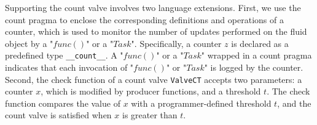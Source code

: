 

Supporting the count valve involves two language extensions. First, we use the count pragma to enclose the corresponding definitions and operations of a counter, which is used to monitor the number of updates performed on the fluid object by a "$func()$" or a "$Task$". Specifically, a counter $z$ is declared as a predefined type {\tt \_\_count\_\_}. A "$func()$" or a "$Task$" wrapped in a count pragma indicates that each invocation of "$func()$" or "$Task$" is logged by the counter. Second, the check function of a count valve {\tt ValveCT} accepts two parameters: a counter $x$, which is modified by producer functions, and a threshold $t$. The check function compares the value of $x$ with a programmer-defined threshold $t$, and the count valve is satisfied when $x$ is greater than $t$.

